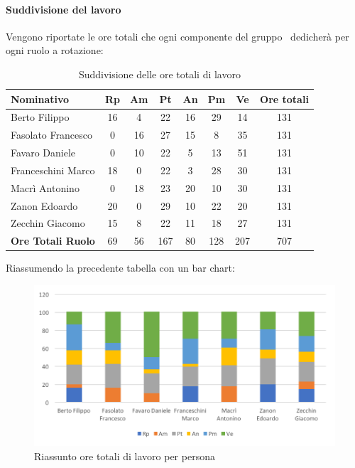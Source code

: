 \documentclass[../PianoDiProgetto.tex]{subfiles}
\begin{document}
			\paragraph{Suddivisione del lavoro}
			Vengono riportate le ore totali che ogni componente del gruppo \kpanic\ dedicherà per ogni ruolo a rotazione:
			\begin{table}[h]
				\begin{tabularx}{\textwidth}{l * {6}{C} c}
				\toprule
				\textbf{Nominativo} & \textbf{Rp} & \textbf{Am} & \textbf{Pt} & \textbf{An} & \textbf{Pm} & \textbf{Ve} & \textbf{Ore totali} \\
				\midrule
				Berto Filippo &	16 & 4 & 22 & 16 & 29 & 14 & 131 \\
				Fasolato Francesco & 0 & 16 & 27 & 15 & 8 & 35 & 131 \\
				Favaro Daniele & 0 & 10 & 22 & 5 & 13 & 51 & 131 \\
				Franceschini Marco & 18 & 0 & 22 & 3 & 28 & 30 & 131 \\
				Macrì Antonino & 0 & 18 & 23 & 20 & 10 & 30 & 131 \\
				Zanon Edoardo &	20 & 0 & 29 & 10 & 22 & 20 & 131 \\
				Zecchin Giacomo & 15 & 8 & 22 & 11 & 18 & 27 & 131 \\
				\midrule			
				\textbf{Ore Totali Ruolo} & 69 & 56 & 167 & 80 & 128 & 207 & 707 \\
				\bottomrule
				\end{tabularx}
				\caption{Suddivisione delle ore totali di lavoro}		
			\end{table}

			Riassumendo la precedente tabella con un bar chart:
			\begin{figure}[!h]
				\centering
				\includegraphics[width=\textwidth]{Preventivo/Immagini/rendicontato_oreRuoloPersona.png}
				\caption{Riassunto ore totali di lavoro per persona}
			\end{figure}	
			
\end{document}
